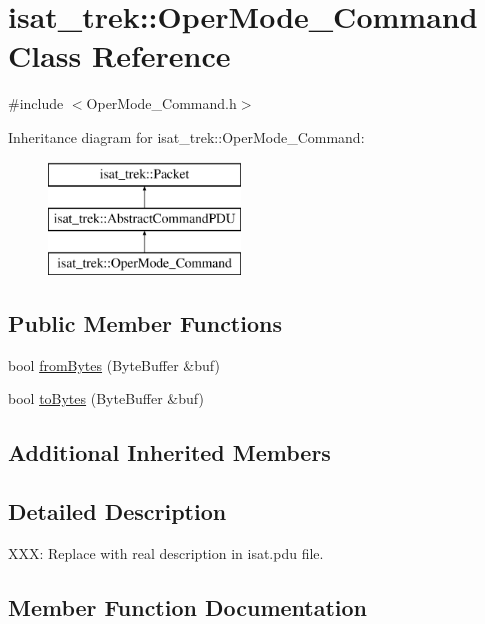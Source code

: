 \hypertarget{classisat__trek_1_1_oper_mode___command}{}\section{isat\+\_\+trek\+:\+:Oper\+Mode\+\_\+\+Command Class Reference}
\label{classisat__trek_1_1_oper_mode___command}


{\ttfamily \#include $<$Oper\+Mode\+\_\+\+Command.\+h$>$}

Inheritance diagram for isat\+\_\+trek\+:\+:Oper\+Mode\+\_\+\+Command\+:\begin{figure}[H]
\begin{center}
\leavevmode
\includegraphics[height=3.000000cm]{classisat__trek_1_1_oper_mode___command}
\end{center}
\end{figure}
\subsection*{Public Member Functions}
\begin{DoxyCompactItemize}
\item 
bool \hyperlink{classisat__trek_1_1_oper_mode___command_a8c075aead046b3ed44127a5d32b8fc91}{from\+Bytes} (Byte\+Buffer \&buf)
\item 
bool \hyperlink{classisat__trek_1_1_oper_mode___command_adddeb62a37efe48bd85fa801067cb970}{to\+Bytes} (Byte\+Buffer \&buf)
\end{DoxyCompactItemize}
\subsection*{Additional Inherited Members}


\subsection{Detailed Description}
X\+XX\+: Replace with real description in isat.\+pdu file. 

\subsection{Member Function Documentation}
